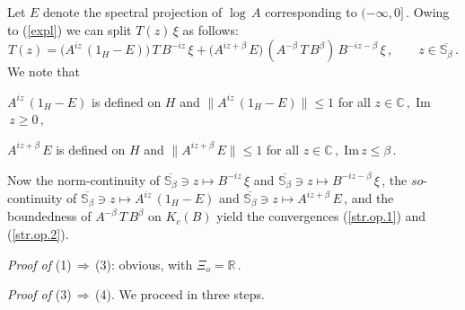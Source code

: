 \documentclass[reqno]{amsart}
\theoremstyle{definition}
\theoremstyle{remark}
\numberwithin{equation}{section}
\theoremstyle{plain}
\begin{document}
Let $E$ denote the spectral projection of $\log\, A$ corresponding
to $(-\infty ,0]\,$. Owing to (\ref{expl}) we can split $T(z)\,\xi$
as follows:
\begin{equation*}
T(z)=\big( A^{iz}\, (1_H -E)\big)\, T\, B^{-iz}\,\xi +
\big( A^{iz+\beta}\, E\big)\, (A^{-\beta}\, T\, B^\beta )\,
B^{-iz-\beta}\,\xi\, ,\qquad z\in \overline{\mathbb S_\beta}\, .
\end{equation*}
We note that
\begin{center}
$A^{iz}\, (1_H -E)$ is defined on $H$ and $\| A^{iz}\, (1_H -E)\|
\leq 1$ for all $z\in\mathbb C\, ,\;$Im$\, z\geq 0\,$,
\end{center}
\hspace{0.2 cm} $A^{iz+\beta}\, E$ is defined on $H$ and
$\| A^{iz+\beta}\, E\|\leq 1$ for all $z\in\mathbb C\, ,\;$Im$\, z
\leq\beta\,$.

\noindent Now the norm-continuity of $\overline{\mathbb S_\beta}\ni
z\mapsto B^{-iz}\,\xi$ and $\overline{\mathbb S_\beta}\ni z\mapsto
B^{-iz-\beta}\,\xi\,$, the $so$-continuity of
$\overline{\mathbb S_\beta}\ni z\mapsto A^{iz}\, (1_H -E)$ and
$\overline{\mathbb S_\beta}\ni z\mapsto A^{iz+\beta}\, E\,$, and
the boundedness of $A^{-\beta}\, T\, B^\beta$ on $K_c(B)$ yield the
convergences (\ref{str.op.1}) and (\ref{str.op.2}).
\medskip

{\it Proof of }(1)$\,\Rightarrow\,$(3): obvious, with $\Xi_o =
\mathbb R\,$.
\medskip

{\it Proof of }(3)$\,\Rightarrow\,$(4). We proceed in three steps.
\smallskip
\end{document}
